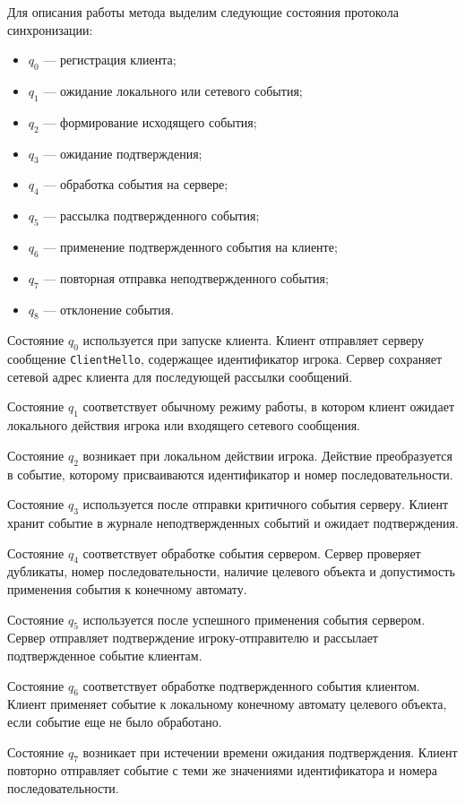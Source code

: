 Для описания работы метода выделим следующие состояния протокола синхронизации:
\begin{itemize}
	\item $q_0$ --- регистрация клиента;
	\item $q_1$ --- ожидание локального или сетевого события;
	\item $q_2$ --- формирование исходящего события;
	\item $q_3$ --- ожидание подтверждения;
	\item $q_4$ --- обработка события на сервере;
	\item $q_5$ --- рассылка подтвержденного события;
	\item $q_6$ --- применение подтвержденного события на клиенте;
	\item $q_7$ --- повторная отправка неподтвержденного события;
	\item $q_8$ --- отклонение события.
\end{itemize}

Состояние $q_0$ используется при запуске клиента. Клиент отправляет серверу сообщение \texttt{ClientHello}, содержащее идентификатор игрока. Сервер сохраняет сетевой адрес клиента для последующей рассылки сообщений.

Состояние $q_1$ соответствует обычному режиму работы, в котором клиент ожидает локального действия игрока или входящего сетевого сообщения.

Состояние $q_2$ возникает при локальном действии игрока. Действие преобразуется в событие, которому присваиваются идентификатор и номер последовательности.

Состояние $q_3$ используется после отправки критичного события серверу. Клиент хранит событие в журнале неподтвержденных событий и ожидает подтверждения.

Состояние $q_4$ соответствует обработке события сервером. Сервер проверяет дубликаты, номер последовательности, наличие целевого объекта и допустимость применения события к конечному автомату.

Состояние $q_5$ используется после успешного применения события сервером. Сервер отправляет подтверждение игроку-отправителю и рассылает подтвержденное событие клиентам.

Состояние $q_6$ соответствует обработке подтвержденного события клиентом. Клиент применяет событие к локальному конечному автомату целевого объекта, если событие еще не было обработано.

Состояние $q_7$ возникает при истечении времени ожидания подтверждения. Клиент повторно отправляет событие с теми же значениями идентификатора и номера последовательности.

